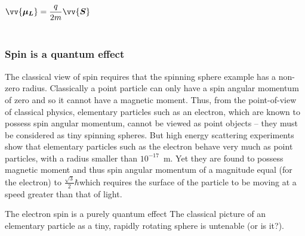 \begin{frame}
\begin{columns}
\[
\vv{\bm{\mu_L}} = \frac{q}{2m}\vv{\bm{S}} 
\]
\end{columns}
\end{frame}

\begin{frame}
\frametitle{Spin is a quantum effect}
 
The classical view of spin requires that the spinning sphere example has a non-zero radius. Classically a point particle can only have a spin angular momentum of zero and so it cannot have a magnetic moment. Thus, from the point-of-view of classical physics, elementary particles such as an electron, which are known to possess spin angular momentum, cannot be viewed as point objects -- they must be considered as tiny spinning spheres. But high energy scattering experiments show that \alert{elementary particles such as the electron behave very much as point particles}, with a radius smaller than $10^{-17}$~m. Yet they are found to possess magnetic moment and thus spin angular momentum of a magnitude equal (for the electron) to 
$\frac{\sqrt{3}}{2} \hbar$which requires the surface of the particle to be moving at a speed greater than that of light. 
 
\begin{alertblock}{The electron spin is a purely quantum effect}
The classical picture of an elementary particle as a tiny, rapidly rotating sphere is untenable (or is it?).
\end{alertblock}
 \end{frame}
 
